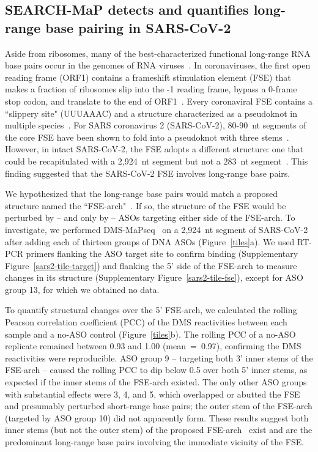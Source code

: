 \documentclass[main.tex]{subfiles}
\begin{document}
\subsection{SEARCH-MaP detects and quantifies long-range base pairing in SARS-CoV-2}

Aside from ribosomes, many of the best-characterized functional long-range RNA base pairs occur in the genomes of RNA viruses~\cite{Nicholson2014}.
In coronaviruses, the first open reading frame (ORF1) contains a frameshift stimulation element (FSE) that makes a fraction of ribosomes slip into the -1 reading frame, bypass a 0-frame stop codon, and translate to the end of ORF1~\cite{Plant2008}.
Every coronaviral FSE contains a ``slippery site" (UUUAAAC) and a structure characterized as a pseudoknot in multiple species~\cite{Brierley1989,Herald1993,Plant2005b}.
For SARS coronavirus 2 (SARS-CoV-2), 80-90~nt segments of the core FSE have been shown to fold into a pseudoknot with three stems~\cite{KZhang2021,Roman2021,Jones2022}.
However, in intact SARS-CoV-2, the FSE adopts a different structure: one that could be recapitulated with a 2,924~nt segment but not a 283~nt segment~\cite{Lan2022}.
This finding suggested that the SARS-CoV-2 FSE involves long-range base pairs.

We hypothesized that the long-range base pairs would match a proposed structure named the ``FSE-arch"~\cite{Ziv2020}.
If so, the structure of the FSE would be perturbed by -- and only by -- ASOs targeting either side of the FSE-arch.
To investigate, we performed DMS-MaPseq~\cite{Zubradt2016} on a 2,924~nt segment of SARS-CoV-2 after adding each of thirteen groups of DNA ASOs (Figure~\ref{tiles}a).
We used RT-PCR primers flanking the ASO target site to confirm binding (Supplementary Figure~\ref{sars2-tile-target}) and flanking the 5' side of the FSE-arch to measure changes in its structure (Supplementary Figure~\ref{sars2-tile-fse}), except for ASO group 13, for which we obtained no data.

To quantify structural changes over the 5' FSE-arch, we calculated the rolling Pearson correlation coefficient (PCC) of the DMS reactivities between each sample and a no-ASO control (Figure~\ref{tiles}b).
The rolling PCC of a no-ASO replicate remained between 0.93 and 1.00 (mean~=~0.97), confirming the DMS reactivities were reproducible.
ASO group 9 -- targeting both 3' inner stems of the FSE-arch -- caused the rolling PCC to dip below 0.5 over both 5' inner stems, as expected if the inner stems of the FSE-arch existed.
The only other ASO groups with substantial effects were 3, 4, and 5, which overlapped or abutted the FSE and presumably perturbed short-range base pairs; the outer stem of the FSE-arch (targeted by ASO group 10) did not apparently form.
These results suggest both inner stems (but not the outer stem) of the proposed FSE-arch~\cite{Ziv2020} exist and are the predominant long-range base pairs involving the immediate vicinity of the FSE.
\end{document}
